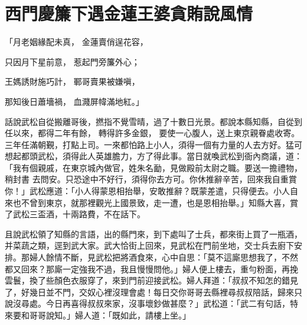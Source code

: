 %

\chapter{西門慶簾下遇金蓮\KG 王婆貪賄說風情}

「月老姻緣配未真，  金蓮賣俏逞花容，

只因月下星前意，  惹起門旁簾外心；

王媽誘財施巧計，  鄆哥賣果被嫌嗔，

那知後日蕭墻禍，  血濺屏幃滿地紅。」

話說武松自從搬離哥後，撚指不覺雪晴，過了十數日光景。都說本縣知縣，自從到任以來，都得二年有餘，
轉得許多金銀，
要使一心腹人，送上東京親眷處收寄。三年任滿朝覲，打點上司。一來都怕路上小人，須得一個有力量的人去方好。猛可想起都頭武松，須得此人英雄膽力，方了得此事。當日就喚武松到衙內商議，道：「我有個親戚，在東京城內做官，姓朱名勔，見做殿前太尉之職。要送一擔禮物，
稍封書
去問安。只恐途中不好行，須得你去方可。你休推辭辛苦，回來我自重賞你！」武松應道：「小人得蒙恩相抬舉，安敢推辭？既蒙差遣，只得便去。小人自來也不曾到東京，就那裡觀光上國景致，走一遭，也是恩相抬舉。」知縣大喜，賞了武松三盃酒，十兩路費，不在話下。

且說武松領了知縣的言語，出的縣門來，到下處叫了士兵，都來街上買了一瓶酒，并菜蔬之類，逕到武大家。武大恰街上回來，見武松在門前坐地，交士兵去廚下安排。那婦人餘情不斷，見武松把將酒食來，心中自思：「莫不這廝思想我了，不然都又回來？那廝一定強我不過，我且慢慢問他。」婦人便上樓去，重勻粉面，再挽雲鬟，換了些顏色衣服穿了，來到門前迎接武松。婦人拜道：「叔叔不知怎的錯見了，好幾日並不門，交奴心裡沒理會處！每日交你哥哥去縣裡尋叔叔陪話，歸來只說沒尋處。今日再喜得叔叔來家，沒事壞鈔做甚麼？」武松道：「武二有句話，特來要和哥哥說知。」婦人道：「既如此，請樓上坐。」

